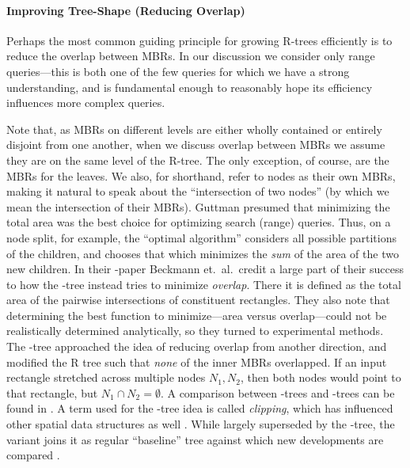 
\paragraph{Improving Tree-Shape (Reducing Overlap)}
Perhaps the most common guiding principle for growing R-trees efficiently is to reduce the overlap between MBRs.
In our discussion we consider only range queries---this is both one of the few queries for which we have a strong understanding, and is fundamental enough to reasonably hope its efficiency influences more complex queries.

Note that, as MBRs on different levels are either wholly contained or entirely disjoint from one another, when we discuss overlap between MBRs we assume they are on the same level of the R-tree.
The only exception, of course, are the MBRs for the leaves.
We also, for shorthand, refer to nodes as their own MBRs, making it natural to speak about the ``intersection of two nodes'' (by which we mean the intersection of their MBRs).
Guttman \cite{guttman84} presumed that minimizing the total area was the best choice for optimizing search (range) queries.
Thus, on a node split, for example, the ``optimal algorithm'' considers all possible partitions of the children, and chooses that which minimizes the \emph{sum} of the area of the two new children.
In their \rstar-paper \cite{beckmannkriegelschneiderseeger90} Beckmann et.\ al.\ credit a large part of their success to how the \rstar-tree instead tries to minimize \emph{overlap}.
There it is defined as the total area of the pairwise intersections of constituent rectangles.
They also note that determining the best function to minimize---area versus overlap---could not be realistically determined analytically, so they turned to experimental methods.
The \rplus-tree \cite{sellisroussopoulosfaloutsos87} approached the idea of reducing overlap from another direction, and modified the R tree such that \emph{none} of the inner MBRs overlapped.
If an input rectangle stretched across multiple nodes $N_1,N_2$, then both nodes would point to that rectangle, but $N_1\cap N_2=\emptyset$.
A comparison between \rbase-trees and \rplus-trees can be found in \cite{greene89}.
A term used for the \rplus-tree idea is called \emph{clipping}, which has influenced other spatial data structures as well \cite{gaedegunther98}.
While largely superseded by the \rstar-tree, the \rplus variant joins it as regular ``baseline'' tree against which new developments are compared \cite{thebook}.

